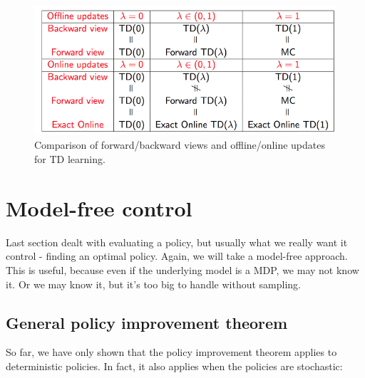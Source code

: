 \documentclass[12pt, a4paper]{article}
\numberwithin{equation}{section}
\begin{document}
\begin{figure}
\centering
\includegraphics[width=\textwidth]{offline_online}
\caption{Comparison of forward/backward views and offline/online updates for TD learning.}
\label{fig:offline_online}
\end{figure}

\section{Model-free control}
Last section dealt with evaluating a policy, but usually what we really want it control - finding an optimal policy. Again, we will take a model-free approach. This is useful, because even if the underlying model is a MDP, we may not know it. Or we may know it, but it's too big to handle without sampling.

\subsection{General policy improvement theorem}
So far, we have only shown that the policy improvement theorem applies to deterministic policies. In fact, it also applies when the policies are stochastic:
\end{document}
